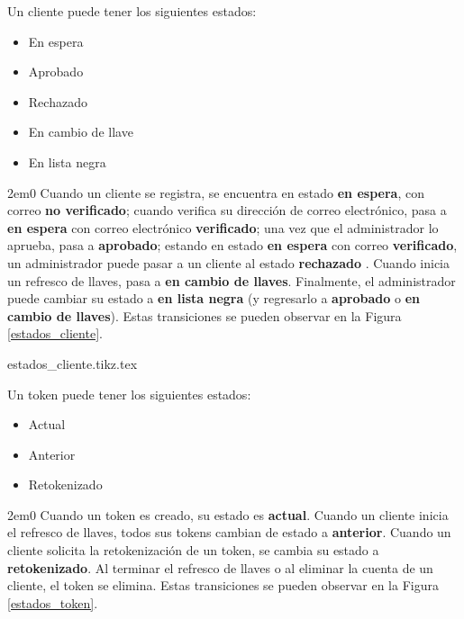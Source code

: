 {
  Un cliente puede tener los siguientes estados:
  \begin{itemize}
    \item En espera
    \item Aprobado
    \item Rechazado
    \item En cambio de llave
    \item En lista negra
  \end{itemize}

  \begin{hangparas}{2em}{0}
    Cuando un cliente se registra, se encuentra en estado \textbf{en espera},
    con correo \textbf{no verificado}; cuando verifica su dirección de correo
    electrónico, pasa a \textbf{en espera} con correo electrónico
    \textbf{verificado}; una vez que el administrador lo aprueba, pasa a
    \textbf{aprobado}; estando en estado \textbf{en espera} con correo
    \textbf{verificado}, un administrador puede pasar a un cliente al estado
    \textbf{rechazado} . Cuando inicia un refresco de llaves, pasa a
    \textbf{en cambio de llaves}. Finalmente, el administrador puede cambiar su
    estado a \textbf{en lista negra} (y regresarlo a \textbf{aprobado} o
    \textbf{en cambio de llaves}). Estas transiciones se pueden observar en la
    Figura \ref{estados_cliente}.
  \end{hangparas}
}

%
%

\begin{sidewaysfigure}
  \begin{center}
    {estados_cliente.tikz.tex}
    \caption{Diagrama de estados de un cliente.}
    \label{estados_cliente}
  \end{center}
\end{sidewaysfigure}

{
  Un token puede tener los siguientes estados:
  \begin{itemize}
    \item Actual
    \item Anterior
    \item Retokenizado
  \end{itemize}

  \begin{hangparas}{2em}{0}
    Cuando un token es creado, su estado es \textbf{actual}. Cuando un cliente
    inicia el refresco de llaves, todos sus tokens cambian de estado a
    \textbf{anterior}. Cuando un cliente solicita la retokenización de un token,
    se cambia su estado a \textbf{retokenizado}. Al terminar el refresco de
    llaves o al eliminar la cuenta de un cliente, el token se elimina. Estas
    transiciones se pueden observar en la Figura \ref{estados_token}.
  \end{hangparas}
}

